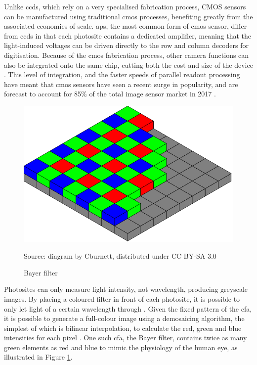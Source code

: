 Unlike \glspl{ccd}, which rely on a very specialised fabrication process, CMOS sensors can be manufactured using traditional \gls{cmos} processes, benefiting greatly from the associated economies of scale. \gls{aps}, the most common form of \gls{cmos} sensor, differ from \glspl{ccd} in that each photosite contains a dedicated amplifier, meaning that the light-induced voltages can be driven directly to the row and column decoders for digitisation. Because of the \gls{cmos} fabrication process, other camera functions can also be integrated onto the same chip, cutting both the cost and size of the device \cite{10_ge_2012}.  This level of integration, and the faster speeds of parallel readout processing have meant that \gls{cmos} sensors have seen a recent surge in popularity, and are forecast to account for 85\% of the total image sensor market in 2017 \cite{11_ic_insights_2013}.

\begin{figure}
  \centering
  \includegraphics[width=1\textwidth]{./img/bayer_pattern.png}\par
Source: diagram by Cburnett, distributed under CC BY-SA 3.0
  \caption{Bayer filter}
  \label{fig:bayer_pattern}
\end{figure}

Photosites can only measure light intensity, not wavelength, producing greyscale images. By placing a coloured filter in front of each photosite, it is possible to only let light of a certain wavelength through \cite{12_eastman_kodak_company_1976}. Given the fixed pattern of the \gls{cfa}, it is possible to generate a full-colour image using a demosaicing algorithm, the simplest of which is bilinear interpolation, to calculate the red, green and blue intensities for each pixel \cite{13_malvar_he_cutler_2015}. One such \gls{cfa}, the Bayer filter, contains twice as many green elements as red and blue to mimic the physiology of the human eye, as illustrated in Figure \ref{fig:bayer_pattern}.